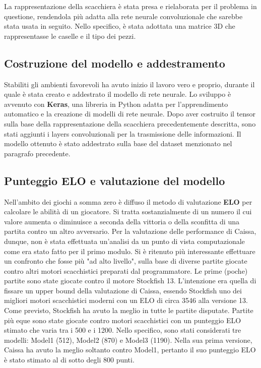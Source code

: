 La rappresentazione della scacchiera è stata presa e rielaborata per il problema in questione, rendendola più adatta alla rete neurale convoluzionale che sarebbe stata usata in seguito. Nello specifico, è stata adottata una matrice 3D che rappresentasse le caselle e il tipo dei pezzi.

\subsection{Costruzione del modello e addestramento}
Stabiliti gli ambienti favorevoli ha avuto inizio il lavoro vero e proprio, durante il quale è stata creato e addestrato il modello di rete neurale. Lo sviluppo è avvenuto con \textbf{Keras}, una libreria in Python adatta per l'apprendimento automatico e la creazione di modelli di rete neurale. Dopo aver costruito il tensor sulla base della rappresentazione della scacchiera precedentemente descritta, sono stati aggiunti i layers convoluzionali per la trasmissione delle informazioni. Il modello ottenuto è stato addestrato sulla base del dataset menzionato nel paragrafo precedente. 

\subsection{Punteggio ELO e valutazione del modello}
Nell'ambito dei giochi a somma zero è diffuso il metodo di valutazione \textbf{ELO} per calcolare le abilità di un giocatore. Si tratta sostanzialmente di un numero il cui valore aumenta o diminuisce a seconda della vittoria o della sconfitta di una partita contro un altro avversario.
Per la valutazione delle performance di Caissa, dunque, non è stata effettuata un'analisi da un punto di vista computazionale come era stato fatto per il primo modulo. Si è ritenuto più interessante effettuare un confronto che fosse più "ad alto livello", sulla base di diverse partite giocate contro altri motori scacchistici preparati dal programmatore. Le prime (poche) partite sono state giocate contro il motore Stockfish 13. L'intenzione era quella di fissare un upper bound della valutazione di Caissa, essendo Stockfish uno dei migliori motori scacchistici moderni con un ELO di circa 3546 alla versione 13. 
Come previsto, Stockfish ha avuto la meglio in tutte le partite disputate. Partite più eque sono state giocate contro motori scacchistici con un punteggio ELO stimato che varia tra i 500 e i 1200. Nello specifico, sono stati considerati tre modelli: Model1 (512), Model2 (870) e Model3 (1190). Nella sua prima versione, Caissa ha avuto la meglio soltanto contro Model1, pertanto il suo punteggio ELO è stato stimato al di sotto degli 800 punti.



\newpage
